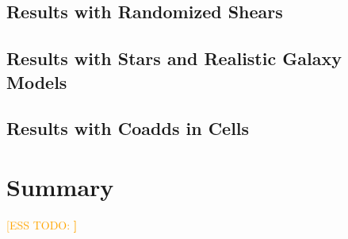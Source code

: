 \documentclass[iop, twocolappendix, appendixfloats, numberedappendix, apj]{hackemulateapj}
\newcommand{\esstodo}[1]{\textcolor{orange}{[ESS TODO: \bf #1]}}
\newcommand{\descwl}{\texttt{WeakLensingDeblending}}
\begin{document}
\subsection{Results with Randomized Shears} \label{sec:results:randshear}

\subsection{Results with Stars and Realistic Galaxy Models} \label{sec:results:full}

\subsection{Results with Coadds in Cells} \label{sec:results:cells}


\section{Summary} \label{sec:summary}

\esstodo{}

% 

\end{document}
